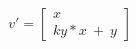 \documentclass[preview]{standalone}
\begin{document}
\begin{align*}
v'=\begin{bmatrix}
                        x\\
                        ky*x\ +\ y
                        \end{bmatrix}\\
\end{align*}
\end{document}
